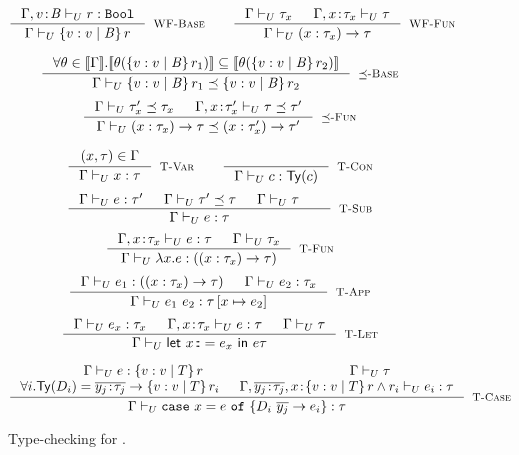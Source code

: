 \newcommand\restrictdecidable[2]{#2}
\begin{figure}[t!]
\centering
\captionsetup{justification=centering}

$$
\inference
   {\undechastype{\Gamma, \tbind{v}{\Base}}
                 {\restrictdecidable{p}{r}}{\tbool}
   }
   {\undeciswellformed{\Gamma}{\tref{v}{\Base}{}{\restrictdecidable{p}{r}}}}
   [\rwbase]
\qquad
\inference{
	\undeciswellformed{\Gamma}{\tau_x} &&
	\undeciswellformed{\Gamma, \tbind{x}{\tau_x}}{\tau}
}{
	\undeciswellformed{\Gamma}{\tfunref{x}{\tau_x}{\tau}{v}{e}}
}[\rwfun]
$$


$$
\inference{
  {\forall \sto\in \interp{\Env}. 
  		 \interp{\thetasub{\sto}{\tref{v}{\Base}{}{\restrictdecidable{p_1}{r_1}}}} 
  		\subseteq   \interp{\thetasub{\sto}{\tref{v}{\Base}{}{\restrictdecidable{p_2}{r_2}}}}}
}{
	\undecissubtype{\Gamma}
		{\tref{v}{\Base}{}{\restrictdecidable{p_1}{r_1}}}
		{\tref{v}{\Base}{}{\restrictdecidable{p_2}{r_2}}}
}[\rsubbase]
$$
$$
\inference{
	\undecissubtype{\Gamma}{\tau'_x}{\tau_x} &&
	\undecissubtype{\Gamma, \tbind{x}{\tau'_x}}{\tau}{\tau'}
}{
	\undecissubtype{\Gamma}{\tfunref{x}{\tau_x}{\tau}{v}{e_1}}{\tfunref{x}{\tau'_x}{\tau'}{v}{e_2}}
}[\rsubfun]
$$

$$
\inference{
	(x,\tau) \in \Gamma 
}{
	\undechastype{\Gamma}{x}{\tau}
}[\rtvar]
\qquad
\inference{
}{
	\undechastype{\Gamma}{c}{\constty{c}}
}[\rtconst]
$$
$$
\inference{
	\undechastype{\Gamma}{e}{\tau'} &&
	\undecissubtype{\Gamma}{\tau'}{\tau} &&
	\undeciswellformed{\Gamma}{\tau} &&
}{
	\undechastype{\Gamma}{e}{\tau}
}[\rtsub]
$$
$$
\inference{
	\undechastype{\Gamma, \tbind{x}{\tau_x}}{e}{\tau} &&
	\undeciswellformed{\Gamma}{\tau_x}
}{
	\undechastype{\Gamma}{\efun{x}{\tau_x}{e}}{(\tfun{x}{\tau_x}{\tau})}
}[\rtfun]
$$
$$
\inference{
	\undechastype{\Gamma}{e_1}{(\tfunref{x}{\tau_{x}}{\tau}{v}{e_v})} &&
	\undechastype{\Gamma}{\restrictdecidable{y}{e_2}}{\tau_{x}}
}{
	\undechastype{\Gamma}{\eapp{e_1}{\restrictdecidable{y}{e_2}}}{\tau\sub{x}{\restrictdecidable{y}{e_2}}}
}[\rtapp]
$$
$$
\inference{
	\undechastype{\Gamma}{e_x}{\tau_{x}} &&
	\undechastype{\Gamma,\tbind{x}{\tau_x}}{e}{\tau} &&
	\undeciswellformed{\Gamma}{\tau}
}{
	\undechastype{\Gamma}{\elet{x}{e_x}{e}}{\tau}
}[\rtlet]
$$

$$\inference{
	\undechastype{\Gamma}{e}{\tref{v}{T}{}{r}} &&
	 \undeciswellformed{\Gamma}{\tau}\\
     \forall i. \constty{D_i} = \overline{\tbind{y_j}{\tau_j}} \rightarrow \tref{v}{T}{}{r_i} &&
      \undechastype{\Gamma, \overline{\tbind{y_j}{\tau_j}}, \tbind{x}{\tref{v}{T}{}{r \land r_i}}}{e_i}{\tau}  \\
}{
	\undechastype{\Gamma}{\ecase{e}{D_i}{\overline{y_j}}{e_i}{x}}{\tau}
}[\rtcase]$$
\caption[Type checking of \undeclang.]{Type-checking for \undeclang.}
\label{fig:refinedhaskell:typing}
\end{figure}

